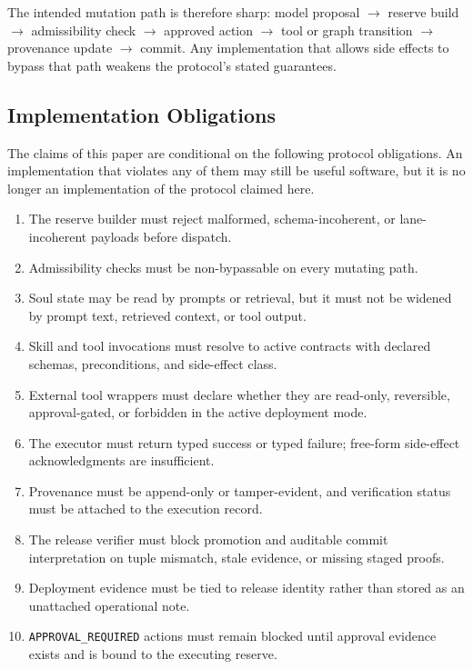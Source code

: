 \documentclass[11pt]{article}
\theoremstyle{remark}
\begin{document}
The intended mutation path is therefore sharp: model proposal \(\to\) reserve build \(\to\) admissibility check \(\to\) approved action \(\to\) tool or graph transition \(\to\) provenance update \(\to\) commit. Any implementation that allows side effects to bypass that path weakens the protocol's stated guarantees.

\subsection{Implementation Obligations}

The claims of this paper are conditional on the following protocol obligations. An implementation that violates any of them may still be useful software, but it is no longer an implementation of the protocol claimed here.

\begin{enumerate}[leftmargin=1.5em]
    \item The reserve builder must reject malformed, schema-incoherent, or lane-incoherent payloads before dispatch.
    \item Admissibility checks must be non-bypassable on every mutating path.
    \item Soul state may be read by prompts or retrieval, but it must not be widened by prompt text, retrieved context, or tool output.
    \item Skill and tool invocations must resolve to active contracts with declared schemas, preconditions, and side-effect class.
    \item External tool wrappers must declare whether they are read-only, reversible, approval-gated, or forbidden in the active deployment mode.
    \item The executor must return typed success or typed failure; free-form side-effect acknowledgments are insufficient.
    \item Provenance must be append-only or tamper-evident, and verification status must be attached to the execution record.
    \item The release verifier must block promotion and auditable commit interpretation on tuple mismatch, stale evidence, or missing staged proofs.
    \item Deployment evidence must be tied to release identity rather than stored as an unattached operational note.
    \item \texttt{APPROVAL\_REQUIRED} actions must remain blocked until approval evidence exists and is bound to the executing reserve.
\end{enumerate}
\end{document}
